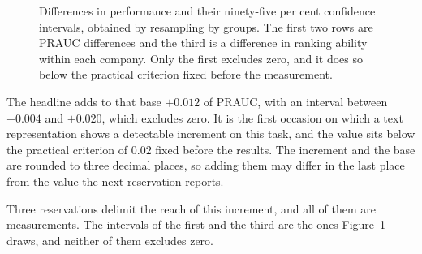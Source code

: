 \begin{figure}[htbp]
\centering
{}
\caption[The three increments, with confidence intervals]{Differences in performance and their
ninety-five per cent confidence intervals, obtained by resampling by groups. The first two rows are
\gls{PRAUC} differences and the third is a difference in ranking ability within each company. Only
the first excludes zero, and it does so below the practical criterion fixed before the
measurement.}
\label{fig:av_acrescimo}
\end{figure}

The headline adds to that base $+0.012$ of \gls{PRAUC}, with an interval between $+0.004$ and
$+0.020$, which excludes zero. It is the first occasion on which a text representation shows a
detectable increment on this task, and the value sits below the practical criterion of $0.02$ fixed
before the results. The increment and the base are rounded to three decimal places, so adding them
may differ in the last place from the value the next reservation reports.

Three reservations delimit the reach of this increment, and all of them are measurements. The
intervals of the first and the third are the ones Figure~\ref{fig:av_acrescimo} draws, and neither
of them excludes zero.

